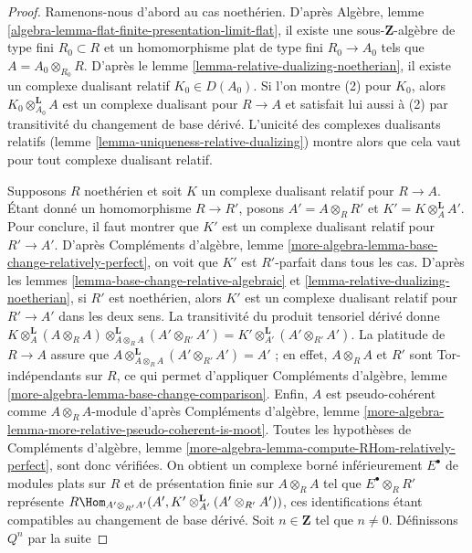 \begin{proof}
Ramenons-nous d'abord au cas noethérien.
D'après Algèbre, lemme \ref{algebra-lemma-flat-finite-presentation-limit-flat}, il existe une sous-$\mathbf{Z}$-algèbre de type fini
$R_0 \subset R$ et un homomorphisme plat de type fini $R_0 \to A_0$ tels que $A = A_0 \otimes_{R_0} R$.
D'après le lemme \ref{lemma-relative-dualizing-noetherian}, il existe un complexe dualisant relatif $K_0 \in D(A_0)$.
Si l'on montre (2) pour $K_0$, alors $K_0 \otimes_{A_0}^\mathbf{L} A$ est un complexe dualisant pour $R \to A$
et satisfait lui aussi à (2) par transitivité du changement de base dérivé.
L'unicité des complexes dualisants relatifs (lemme \ref{lemma-uniqueness-relative-dualizing})
montre alors que cela vaut pour tout complexe dualisant relatif.

\medskip\noindent
Supposons $R$ noethérien et soit $K$ un complexe dualisant relatif pour $R \to A$.
Étant donné un homomorphisme $R \to R'$, posons $A' = A \otimes_R R'$ et $K' = K \otimes_A^\mathbf{L} A'$.
Pour conclure, il faut montrer que $K'$ est un complexe dualisant relatif pour $R' \to A'$.
D'après Compléments d'algèbre, lemme \ref{more-algebra-lemma-base-change-relatively-perfect},
on voit que $K'$ est $R'$-parfait dans tous les cas.
D'après les lemmes \ref{lemma-base-change-relative-algebraic} et \ref{lemma-relative-dualizing-noetherian}, si $R'$ est noethérien,
alors $K'$ est un complexe dualisant relatif pour $R' \to A'$ dans les deux sens.
La transitivité du produit tensoriel dérivé donne $K \otimes_A^\mathbf{L} (A \otimes_R A)
\otimes_{A \otimes_R A}^\mathbf{L} (A' \otimes_{R'} A') =
K' \otimes_{A'}^\mathbf{L} (A' \otimes_{R'} A')$.
La platitude de $R \to A$ assure que $A \otimes_{A \otimes_R A}^\mathbf{L} (A' \otimes_{R'} A') = A'$ ;
en effet, $A \otimes_R A$ et $R'$ sont Tor-indépendants sur $R$,
ce qui permet d'appliquer Compléments d'algèbre, lemme \ref{more-algebra-lemma-base-change-comparison}.
Enfin, $A$ est pseudo-cohérent comme $A \otimes_R A$-module
d'après Compléments d'algèbre, lemme \ref{more-algebra-lemma-more-relative-pseudo-coherent-is-moot}.
Toutes les hypothèses de Compléments d'algèbre, lemme \ref{more-algebra-lemma-compute-RHom-relatively-perfect},
sont donc vérifiées.
On obtient un complexe borné inférieurement $E^\bullet$ de modules
plats sur $R$ et de présentation finie sur $A \otimes_R A$
tel que $E^\bullet \otimes_R R'$ représente $R\Hom_{A' \otimes_{R'} A'}(A',
K' \otimes_{A'}^\mathbf{L} (A' \otimes_{R'} A'))$,
ces identifications étant compatibles au changement de base dérivé.
Soit $n \in \mathbf{Z}$ tel que $n \not = 0$. Définissons $Q^n$ par la suite

\end{proof}
